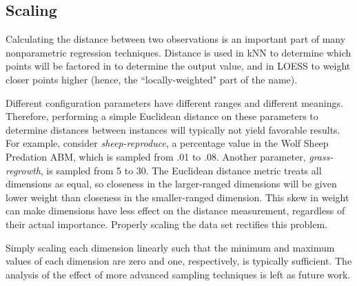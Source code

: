 \subsection{Scaling}

Calculating the distance between two observations is an important part of many nonparametric regression techniques.
Distance is used in kNN to determine which points will  be factored in to determine the output value, and in LOESS to weight closer points higher (hence, the ``locally-weighted" part of the name).

Different configuration parameters have different ranges and different meanings.
Therefore, performing a simple Euclidean distance on these parameters to determine distances between instances will typically not yield favorable results.
For example, consider \textit{sheep-reproduce}, a percentage value in the Wolf Sheep Predation ABM, which is sampled from .01 to .08.
Another parameter, \textit{grass-regrowth}, is sampled from 5 to 30.
The Euclidean distance metric treats all dimensions as equal, so closeness in the larger-ranged dimensions will be given lower weight than closeness in the smaller-ranged dimension.
This skew in weight can make dimensions have less effect on the distance measurement, regardless of their actual importance.
Properly scaling the data set rectifies this problem.


Simply scaling each dimension linearly such that the minimum and maximum values of each dimension are zero and one, respectively, is typically sufficient.
The analysis of the effect of more advanced sampling techniques is left as future work.



